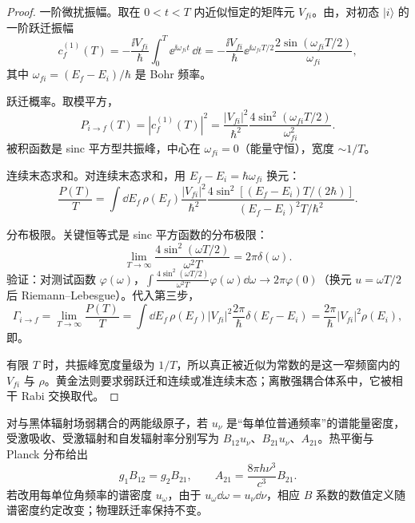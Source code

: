 \begin{proof}
一阶微扰振幅。取在 $0<t<T$ 内近似恒定的矩阵元 $V_{fi}$。由，对初态 $|i\rangle$ 的一阶跃迁振幅
\begin{equation*}
 c_f^{(1)}(T)
 =-\frac{\ii V_{fi}}{\hbar}\int_0^T\ee^{\ii\omega_{fi}t}\,\dd t
 =-\frac{\ii V_{fi}}{\hbar}
 \ee^{\ii\omega_{fi}T/2}
 \frac{2\sin(\omega_{fi}T/2)}{\omega_{fi}},
\end{equation*}
其中 $\omega_{fi}=(E_f-E_i)/\hbar$ 是 Bohr 频率。

跃迁概率。取模平方，
\begin{equation*}
 P_{i\to f}(T)
 =|c_f^{(1)}(T)|^2
 =\frac{|V_{fi}|^2}{\hbar^2}
 \frac{4\sin^2(\omega_{fi}T/2)}{\omega_{fi}^2}.
\end{equation*}
被积函数是 sinc 平方型共振峰，中心在 $\omega_{fi}=0$（能量守恒），宽度 $\sim1/T$。

连续末态求和。对连续末态求和，用 $E_f-E_i=\hbar\omega_{fi}$ 换元：
\begin{equation*}
 \frac{P(T)}{T}
 =\int\dd E_f\,\rho(E_f)
 \frac{|V_{fi}|^2}{\hbar^2}
 \frac{4\sin^2[(E_f-E_i)T/(2\hbar)]}{(E_f-E_i)^2T/\hbar^2}.
\end{equation*}

分布极限。关键恒等式是 sinc 平方函数的分布极限：
\begin{equation*}
 \lim_{T\to\infty}
 \frac{4\sin^2(\omega T/2)}{\omega^2T}
 =2\pi\delta(\omega).
\end{equation*}
验证：对测试函数 $\varphi(\omega)$，$\int\frac{4\sin^2(\omega T/2)}{\omega^2T}\varphi(\omega)\dd\omega\to2\pi\varphi(0)$（换元 $u=\omega T/2$ 后 Riemann--Lebesgue）。代入第三步，
\begin{equation*}
 \Gamma_{i\to f}
 =\lim_{T\to\infty}\frac{P(T)}{T}
 =\int\dd E_f\,\rho(E_f)|V_{fi}|^2\frac{2\pi}{\hbar}\delta(E_f-E_i)
 =\frac{2\pi}{\hbar}|V_{fi}|^2\rho(E_i),
\end{equation*}
即。

有限 $T$ 时，共振峰宽度量级为 $1/T$，所以真正被近似为常数的是这一窄频窗内的 $V_{fi}$ 与 $\rho$。黄金法则要求弱跃迁和连续或准连续末态；离散强耦合体系中，它被相干 Rabi 交换取代。


\end{proof}

对与黑体辐射场弱耦合的两能级原子，若 $u_\nu$ 是“每单位普通频率”的谱能量密度，受激吸收、受激辐射和自发辐射率分别写为 $B_{12}u_\nu$、$B_{21}u_\nu$、$A_{21}$。热平衡与 Planck 分布给出
\begin{equation}
 g_1B_{12}=g_2B_{21},
\qquad
A_{21}=\frac{8\pi h\nu^3}{c^3}B_{21}.
\label{eq:einstein-relations}
\end{equation}
若改用每单位角频率的谱密度 $u_\omega$，由于 $u_\omega\dd\omega=u_\nu\dd\nu$，相应 $B$ 系数的数值定义随谱密度约定改变；物理跃迁率保持不变。

